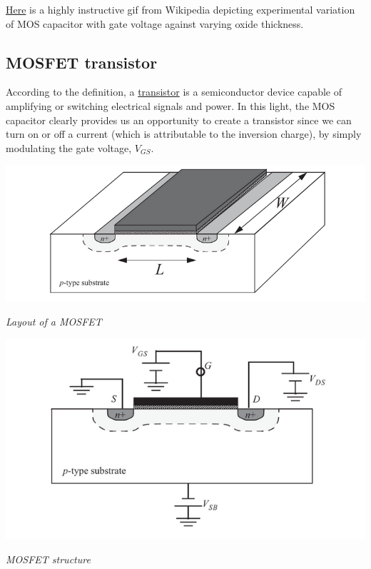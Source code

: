 \documentclass[12 pt]{article}
\begin{document}
\href{https://upload.wikimedia.org/wikipedia/commons/7/78/Illustration_of_C-V_measurement.gif}{Here} is a highly instructive gif from Wikipedia depicting experimental variation of MOS capacitor with gate voltage against varying oxide thickness.

\subsection{MOSFET transistor}

According to the definition, a \href{https://en.wikipedia.org/wiki/Transistor}{transistor} is a semiconductor device capable of amplifying or switching electrical signals and power. In this light, the MOS capacitor clearly provides us an opportunity to create a transistor since we can turn on or off a current (which is attributable to the inversion charge), by simply modulating the gate voltage, $V_{GS}$. \newline

\par
\begin{center}
    \includegraphics{MOSFET_1 (1).png}
\end{center}
\begin{center}
    \emph{\hspace{3 cm}Layout of a MOSFET\newline}
\end{center}
\par

\par
\begin{center}
    \includegraphics{MOSFET.png}
\end{center}
\begin{center}
    \emph{\hspace{3 cm}MOSFET structure\newline}
\end{center}
\par
\end{document}
